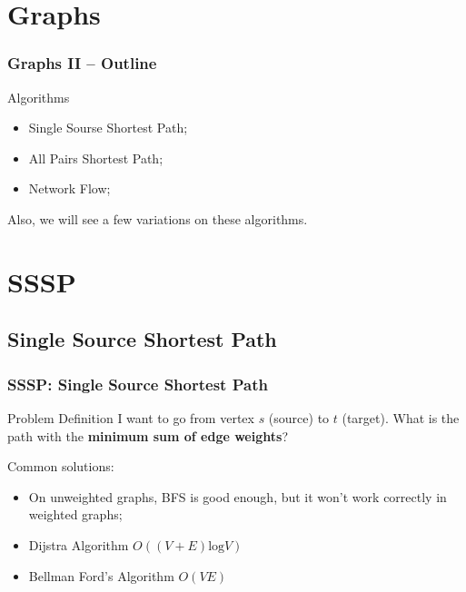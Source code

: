 \section{Graphs}

\begin{frame}
  \frametitle{Graphs II -- Outline}
  \begin{block}{Algorithms}
    \begin{itemize}
    \item Single Sourse Shortest Path;
    \item All Pairs Shortest Path;
    \item Network Flow;
    \end{itemize}
  \end{block}

  \bigskip

  Also, we will see a few variations on these algorithms.
\end{frame}

\section{SSSP}

\subsection{Single Source Shortest Path}
\begin{frame}
  \frametitle{SSSP: Single Source Shortest Path}
  \begin{block}{Problem Definition}
    I want to go from vertex $s$ (source) to $t$ (target). What is
    the path with the {\bf minimum sum of edge weights}?
  \end{block}

  \bigskip

  {\smaller
    Common solutions:

    \begin{itemize}
    \item On \alert{unweighted} graphs, BFS is good enough, but it
      won't work correctly in weighted graphs;
    \item Dijstra Algorithm $O((V+E)\text{log}V)$
    \item Bellman Ford's Algorithm $O(VE)$
    \end{itemize}
  }
\end{frame}


